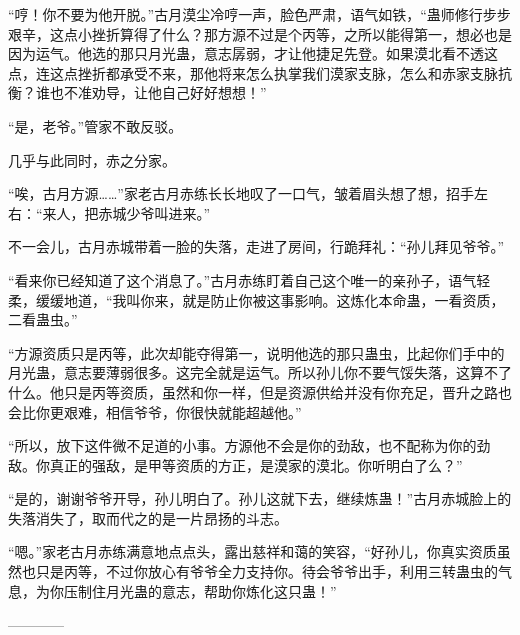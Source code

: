 \begin{this_body}
“哼！你不要为他开脱。”古月漠尘冷哼一声，脸色严肃，语气如铁，“蛊师修行步步艰辛，这点小挫折算得了什么？那方源不过是个丙等，之所以能得第一，想必也是因为运气。他选的那只月光蛊，意志孱弱，才让他捷足先登。如果漠北看不透这点，连这点挫折都承受不来，那他将来怎么执掌我们漠家支脉，怎么和赤家支脉抗衡？谁也不准劝导，让他自己好好想想！”

“是，老爷。”管家不敢反驳。

几乎与此同时，赤之分家。

“唉，古月方源……”家老古月赤练长长地叹了一口气，皱着眉头想了想，招手左右：“来人，把赤城少爷叫进来。”

不一会儿，古月赤城带着一脸的失落，走进了房间，行跪拜礼：“孙儿拜见爷爷。”

“看来你已经知道了这个消息了。”古月赤练盯着自己这个唯一的亲孙子，语气轻柔，缓缓地道，“我叫你来，就是防止你被这事影响。这炼化本命蛊，一看资质，二看蛊虫。”

“方源资质只是丙等，此次却能夺得第一，说明他选的那只蛊虫，比起你们手中的月光蛊，意志要薄弱很多。这完全就是运气。所以孙儿你不要气馁失落，这算不了什么。他只是丙等资质，虽然和你一样，但是资源供给并没有你充足，晋升之路也会比你更艰难，相信爷爷，你很快就能超越他。”

“所以，放下这件微不足道的小事。方源他不会是你的劲敌，也不配称为你的劲敌。你真正的强敌，是甲等资质的方正，是漠家的漠北。你听明白了么？”

“是的，谢谢爷爷开导，孙儿明白了。孙儿这就下去，继续炼蛊！”古月赤城脸上的失落消失了，取而代之的是一片昂扬的斗志。

“嗯。”家老古月赤练满意地点点头，露出慈祥和蔼的笑容，“好孙儿，你真实资质虽然也只是丙等，不过你放心有爷爷全力支持你。待会爷爷出手，利用三转蛊虫的气息，为你压制住月光蛊的意志，帮助你炼化这只蛊！”

------------

\end{this_body}

